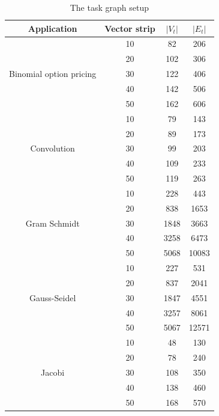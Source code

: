 \begin{table}[h!]
  \centering
  \begin{tabular}{|c|c|c|c|}
    \hline
    \textbf{Application} & \textbf{Vector strip} & $|V_t|$ & $|E_t|$ \\
    \hline
    \multirow{5}{*}{Binomial option pricing} & 10 & 82 & 206 \\
    & 20 & 102 & 306 \\
    & 30 & 122 & 406 \\
    & 40 & 142 & 506 \\
    & 50 & 162 & 606 \\
    \hline
    \multirow{5}{*}{Convolution} & 10 & 79 & 143 \\
    & 20 & 89 & 173 \\
    & 30 & 99 & 203 \\
    & 40 & 109 & 233 \\
    & 50 & 119 & 263 \\
    \hline
    \multirow{5}{*}{Gram Schmidt} & 10 & 228 & 443 \\
    & 20 & 838 & 1653 \\
    & 30 & 1848 & 3663 \\
    & 40 & 3258 & 6473 \\
    & 50 & 5068 & 10083\\
    \hline
    \multirow{5}{*}{Gauss-Seidel} & 10 & 227 & 531 \\
    & 20 & 837 & 2041 \\
    & 30 & 1847 & 4551 \\
    & 40 & 3257 & 8061 \\
    & 50 & 5067 & 12571\\
    \hline
    \multirow{5}{*}{Jacobi} & 10 & 48 & 130 \\
    & 20 & 78 & 240 \\
    & 30 & 108 & 350 \\
    & 40 & 138 & 460 \\ 
    & 50 & 168 & 570\\
    \hline
  \end{tabular}
  \caption{The task graph setup}
  \label{tab:1}
\end{table}


